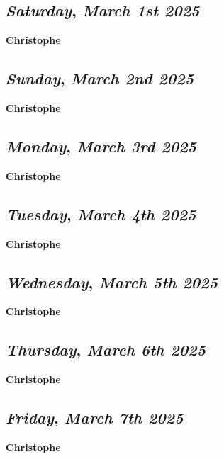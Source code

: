\begin{center}
\section*{\month}
\end{center}

\def\day{\textit{March 1st 2025}}
\def\weekday{\textit{Saturday}}
\subsection*{\weekday, \day}
\textbf {Christophe}

\def\day{\textit{March 2nd 2025}}
\def\weekday{\textit{Sunday}}
\subsection*{\weekday, \day}
\textbf {Christophe}

\def\day{\textit{March 3rd 2025}}
\def\weekday{\textit{Monday}}
\subsection*{\weekday, \day}
\textbf {Christophe}

\def\day{\textit{March 4th 2025}}
\def\weekday{\textit{Tuesday}}
\subsection*{\weekday, \day}
\textbf {Christophe}

\def\day{\textit{March 5th 2025}}
\def\weekday{\textit{Wednesday}}
\subsection*{\weekday, \day}
\textbf {Christophe}

\def\day{\textit{March 6th 2025}}
\def\weekday{\textit{Thursday}}
\subsection*{\weekday, \day}
\textbf {Christophe}

\def\day{\textit{March 7th 2025}}
\def\weekday{\textit{Friday}}
\subsection*{\weekday, \day}
\textbf {Christophe}

\def\day{\textit{March 8th 2025}}
\def\weekday{\textit{Saturday}}
